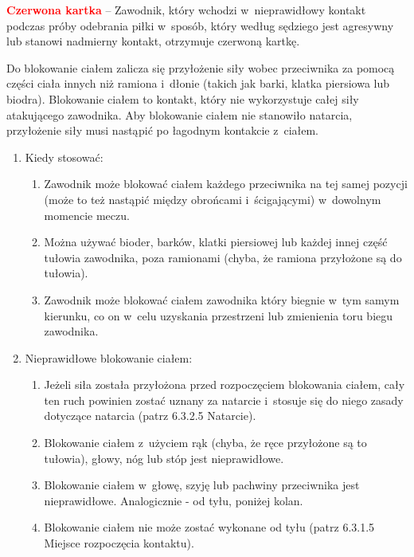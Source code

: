 \documentclass[12pt,a4paper]{article}
\renewcommand{\paragraph}[1]{
  \oldparagraph{#1}%
  \leftskip2cm
}
\newcommand\redcard[1]{\bgroup\textcolor{red}{\textbf{#1}}}
\begin{document}
\redcard{Czerwona kartka} -- Zawodnik, który wchodzi w~nieprawidłowy kontakt
podczas próby odebrania piłki w~sposób, który według sędziego jest
agresywny lub stanowi nadmierny kontakt, otrzymuje czerwoną kartkę.

\paragraph{Blokowanie ciałem}
Do blokowanie ciałem zalicza się
przyłożenie siły wobec przeciwnika za pomocą części ciała innych niż
ramiona i~dłonie (takich jak barki, klatka piersiowa lub biodra).
Blokowanie ciałem to kontakt, który nie wykorzystuje całej siły
atakującego zawodnika. Aby blokowanie ciałem nie stanowiło natarcia,
przyłożenie siły musi nastąpić po łagodnym kontakcie z~ciałem.

\begin{enumerate}
	\item
	      Kiedy stosować:

	      \begin{enumerate}
		      \item
		            Zawodnik może blokować ciałem każdego przeciwnika na tej samej
		            pozycji (może to też nastąpić między obrońcami i~ścigającymi) w~dowolnym momencie meczu.
		      \item
		            Można używać bioder, barków, klatki piersiowej lub każdej innej
		            część tułowia zawodnika, poza ramionami (chyba, że ramiona
		            przyłożone są do tułowia).
		      \item
		            Zawodnik może blokować ciałem zawodnika który biegnie w~tym samym
		            kierunku, co on w~celu uzyskania przestrzeni lub zmienienia toru
		            biegu zawodnika.
	      \end{enumerate}
	\item
	      Nieprawidłowe blokowanie ciałem:

	      \begin{enumerate}
		      \item
		            Jeżeli siła została przyłożona przed rozpoczęciem blokowania ciałem,
		            cały ten ruch powinien zostać uznany za natarcie i~stosuje się do
		            niego zasady dotyczące natarcia (patrz 6.3.2.5 Natarcie).
		      \item
		            Blokowanie ciałem z~użyciem rąk (chyba, że ręce przyłożone są to
		            tułowia), głowy, nóg lub stóp jest nieprawidłowe.
		      \item
		            Blokowanie ciałem w~głowę, szyję lub pachwiny przeciwnika jest
		            nieprawidłowe. Analogicznie - od tyłu, poniżej kolan.
		      \item
		            Blokowanie ciałem nie może zostać wykonane od tyłu (patrz 6.3.1.5
		            Miejsce rozpoczęcia kontaktu).
	      \end{enumerate}
\end{enumerate}
\end{document}
